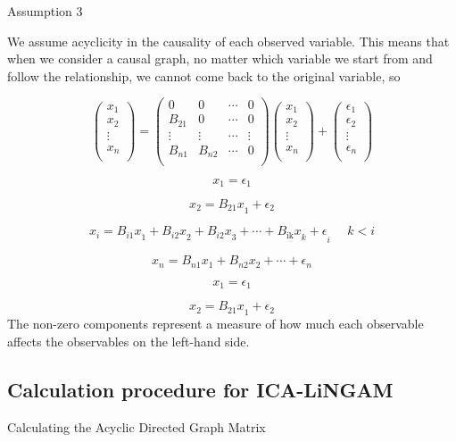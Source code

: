 \documentclass[pdftex]{article}
\begin{document}
Assumption 3 \par
We assume acyclicity in the causality of each observed variable. This means that when we consider a causal graph, no matter which variable we start from and follow the relationship, we cannot come back to the original variable, so

$$\begin{pmatrix}
x_{1} \\
x_{2} \\
 \vdots \\
x_{n} \\
\end{pmatrix} = \begin{pmatrix}
0 & 0 & \cdots & 0 \\
B_{21} & 0 & \cdots & 0 \\
 \vdots & \vdots & \cdots & \vdots \\
B_{n1} & B_{n2} & \cdots & 0 \\
\end{pmatrix}\begin{pmatrix}
x_{1} \\
x_{2} \\
 \vdots \\
x_{n} \\
\end{pmatrix} + \begin{pmatrix}
\epsilon_{1} \\
\epsilon_{2} \\
 \vdots \\
\epsilon_{n} \\
\end{pmatrix}$$

$$x_{1} = \epsilon_{1}$$

$$x_{2} = {B_{21}x}_{1} + \epsilon_{2}$$

$$x_{i} = {B_{i1}x}_{1} + {{B_{i2}x}_{2} + {B_{i2}x}_{3} + \cdots + {B_{\text{ik}}x}_{k} + \epsilon}_{i}\ \ \ \ \ \ k < i$$

$$x_{n} = B_{n1}x_{1} + B_{n2}x_{2} + \cdots + \epsilon_{n}$$

$$x_{1} = \epsilon_{1}$$

$$x_{2} = {B_{21}x}_{1} + \epsilon_{2}$$
The non-zero components represent a measure of how much each observable affects the observables on the left-hand side.

\subsection{Calculation procedure for ICA-LiNGAM}
Calculating the Acyclic Directed Graph Matrix \par
\end{document}

